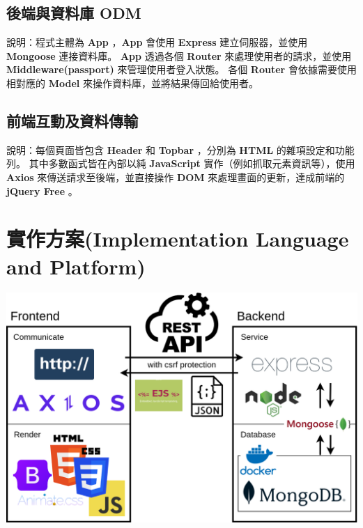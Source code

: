 \documentclass{article}
\begin{document}
\subsection{後端與資料庫 ODM}



\bigskip

說明：程式主體為 \textbf{App} ，\textbf{App} 會使用 \textbf{Express} 建立伺服器，並使用 \textbf{Mongoose} 連接資料庫。
\textbf{App} 透過各個 \textbf{Router} 來處理使用者的請求，並使用 \textbf{Middleware(passport)} 來管理使用者登入狀態。
各個 \textbf{Router} 會依據需要使用相對應的 \textbf{Model} 來操作資料庫，並將結果傳回給使用者。

\pagebreak

\subsection{前端互動及資料傳輸}



說明：每個頁面皆包含 \textbf{Header} 和 \textbf{Topbar} ，分別為 \textbf{HTML} 的雜項設定和功能列。
其中多數函式皆在內部以純 \textbf{JavaScript} 實作（例如抓取元素資訊等），使用 \textbf{Axios} 來傳送請求至後端，並直接操作 \textbf{DOM} 來處理畫面的更新，達成前端的 \textbf{jQuery Free} 。

\newpage

\section[實作方案(IMPLEMENTATION LANGUAGE AND PLATFORM)]{實作方案(Implementation Language and Platform)}

\centerline{\includegraphics[width=\textwidth]{HighLevelArchitecture.png}}
\end{document}
